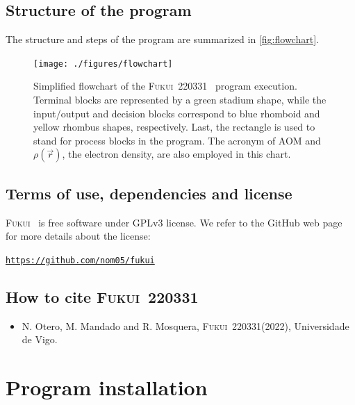 \documentclass[a4paper,11pt,openany]{memoir}
\newcommand\versionprog{220331}
\newcommand\programa{\textsc{Fukui}}
\begin{document}
\section{Structure of the program}
The structure and steps of the program are summarized in \autoref{fig:flowchart}.

\begin{figure}
	\begin{center}
		\texttt{[image: ./figures/flowchart]}
		\caption{Simplified flowchart of the \programa~\versionprog~ program execution. Terminal blocks are represented by a green stadium shape, while the input/output and decision blocks correspond to blue rhomboid and yellow rhombus shapes, respectively. Last, the rectangle is used to stand for process blocks in the program. The acronym of \acf{AOM} and $\rho(\vec{r})$, the electron density, are also employed in this chart.}\label{fig:flowchart}
	\end{center}
\end{figure}

\section{Terms of use, dependencies and license}
\programa~ is free software under GPLv3 license. We refer to the GitHub web page for more details about the license:
\begin{center}
	\texttt{\url{https://github.com/nom05/fukui}}
\end{center}


\section{How to cite \textsc{\programa~\versionprog}}
\begin{itemize}
	\item N. Otero, M. Mandado and R. Mosquera, \programa~\versionprog (2022), Universidade de Vigo.
\end{itemize}


\chapter{Program installation}
\end{document}
